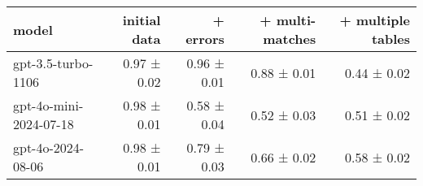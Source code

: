 \begin{tabular}{lrrrr}
\toprule
\textbf{model} & \textbf{initial data} & \textbf{+ errors} & \textbf{+ multi-matches} & \textbf{+ multiple tables} \\
\midrule
gpt-3.5-turbo-1106 & 0.97 ± 0.02 & 0.96 ± 0.01 & 0.88 ± 0.01 & 0.44 ± 0.02 \\
gpt-4o-mini-2024-07-18 & 0.98 ± 0.01 & 0.58 ± 0.04 & 0.52 ± 0.03 & 0.51 ± 0.02 \\
gpt-4o-2024-08-06 & 0.98 ± 0.01 & 0.79 ± 0.03 & 0.66 ± 0.02 & 0.58 ± 0.02 \\
\bottomrule
\end{tabular}
